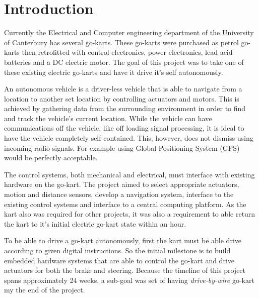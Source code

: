 \section{Introduction}
  Currently the Electrical and Computer engineering department of the
  University of Canterbury has several go-karts. These go-karts were purchased
  as petrol go-karts then retrofitted with control electronics, power
  electronics, lead-acid batteries and a DC electric motor. The goal of this
  project was to take one of these existing electric go-karts and have it drive
  it's self autonomously. 

  An autonomous vehicle is a driver-less vehicle that is able to navigate from
  a location to another set location by controlling actuators and motors. This
  is achieved by gathering data from the surrounding environment in order to
  find and track the vehicle's current location. While the vehicle can have
  communications off the vehicle, like off loading signal processing, it is
  ideal to have the vehicle completely self contained. This, however, does not
  dismiss using incoming radio signals. For example using Global Positioning
  System (GPS) would be perfectly acceptable\cite{yeah,lol}.

  The control systems, both mechanical and electrical, must interface with
  existing hardware on the go-kart. The project aimed to select appropriate
  actuators, motion and distance sensors, develop a navigation system,
  interface to the existing control systems and interface to a central
  computing platform.  As the kart also was required for other projects, it was
  also a requirement to able return the kart to it's initial electric go-kart
  state within an hour.

  To be able to drive a go-kart autonomously, first the kart must be able drive
  according to given digital instructions. So the initial milestone is to build
  embedded hardware systems that are able to control the go-kart and drive
  actuators for both the brake and steering. Because the timeline of this
  project spans approximately 24 weeks, a sub-goal was set of having
  \emph{drive-by-wire} go-kart my the end of the project.


